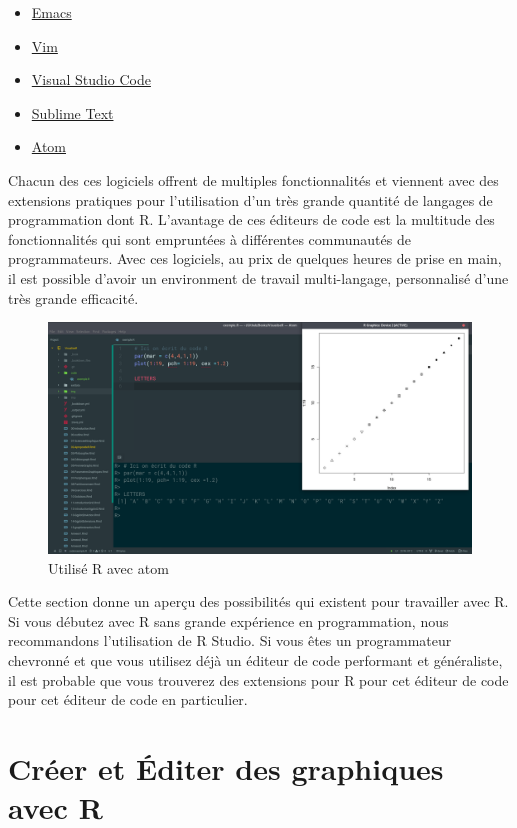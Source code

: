 \documentclass[]{article}
\providecommand{\tightlist}{%
  \setlength{\itemsep}{0pt}\setlength{\parskip}{0pt}}
\begin{document}
\begin{itemize}
\tightlist
\item
  \href{https://www.gnu.org/software/emacs/}{Emacs}
\item
  \href{https://www.vim.org/}{Vim}
\item
  \href{https://code.visualstudio.com/}{Visual Studio Code}
\item
  \href{https://www.sublimetext.com/}{Sublime Text}
\item
  \href{https://atom.io/}{Atom}
\end{itemize}

Chacun des ces logiciels offrent de multiples fonctionnalités et viennent avec des extensions pratiques pour l'utilisation d'un très grande quantité de langages de programmation dont R. L'avantage de ces éditeurs de code est la multitude des fonctionnalités qui sont empruntées à différentes communautés de programmateurs. Avec ces logiciels, au prix de quelques heures de prise en main, il est possible d'avoir un environment de travail multi-langage, personnalisé d'une très grande efficacité.

\begin{figure}
\centering
\includegraphics{img/chap2/ratom.png}
\caption{Utilisé R avec atom}
\end{figure}

Cette section donne un aperçu des possibilités qui existent pour travailler avec R. Si vous débutez avec R sans grande expérience en programmation, nous recommandons l'utilisation de R Studio. Si vous êtes un programmateur chevronné et que vous utilisez déjà un éditeur de code performant et généraliste, il est probable que vous trouverez des extensions pour R pour cet éditeur de code pour cet éditeur de code en particulier.

\hypertarget{cruxe9er-et-uxe9diter-des-graphiques-avec-r}{%
\section{Créer et Éditer des graphiques avec R}\label{cruxe9er-et-uxe9diter-des-graphiques-avec-r}}
\end{document}
